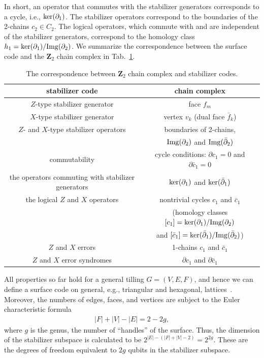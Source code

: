 In short, an operator that commutes with the stabilizer generators corresponds to a cycle, i.e., ${\rm ker}(\partial _1)$.
The stabilizer operators correspond to the boundaries of the 2-chains $c_2 \in C_2$.
The logical operators, which commute with and are independent of the stabilizer generators, correspond to the homology class $h_1 = {\rm ker}(\partial _1)/{\rm Img}(\partial_2)$.
We summarize the correspondence between the surface code and the $\mathbf{Z}_2$ chain complex in Tab.~\ref{tab:ChainStabCode}.
\begin{table}[htdp]
\caption{The correspondence between $\mathbf{Z}_2$ chain complex and stabilizer codes.}
\begin{center}
\begin{tabular}{c|c}
\hline
\hline
stabilizer code & chain complex
\\
\hline
$Z$-type stabilizer generator & face $f_m$
\\
\hline
$X$-type stabilizer generator & vertex $v_k$ (dual face $\bar f_k$)
\\
\hline
$Z$- and $X$-type stabilizer operators & boundaries of 2-chains, 
\\
& ${\rm Img}(\partial _2)$ and  ${\rm Img}(\bar{\partial} _2)$
\\
\hline
commutability & cycle conditions: $\partial c_1 =0$ and $\partial \bar c_1=0$
\\
\hline
the operators commuting with stabilizer generators & ${\rm ker} (\partial _1)$ and  ${\rm ker} (\bar{\partial} _1)$
\\
\hline
the logical $Z$ and $X$ operators & nontrivial cycles $c_1$ and $\bar c_1$
\\
 & (homology classes $[c_1] = {\rm ker}(\partial _1) /{\rm Img}(\partial _2)$ 
 \\
 &
 and $[\bar c_1]={\rm ker}(\bar \partial _1) /{\rm Img}(\bar \partial _2)$)

\\
\hline
$Z$ and $X$ errors & 1-chains $c_1$ and $\bar c_1$
\\
\hline
$Z$ and $X$ error syndromes & $\partial c_1$ and $\partial \bar c_1$
\\
\hline \hline
\end{tabular}
\end{center}
\label{tab:ChainStabCode}
\end{table}%




All properties so far hold for a general tilling $G=(V,E,F)$, and hence we can define a surface code on general, e.g., triangular and hexagonal, lattices~\cite{FujiiTokunaga12}.
Moreover, the numbers of edges, faces, and vertices are subject to the Euler characteristic formula 
\begin{eqnarray}
|F|+|V|-|E| = 2- 2 g,
\end{eqnarray}
where $g$ is the genus, the number of ``handles'' of the surface. 
Thus, the dimension of the stabilizer subspace is calculated to be $2^{|E|-(|F|+|V|-2)}=2^{2g}$.
These are the degrees of freedom equivalent to $2g$ qubits in the stabilizer subspace.

